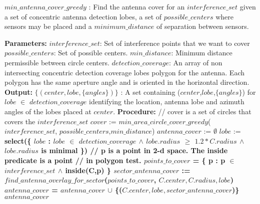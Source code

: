 \begin{algorithm}[!htb]
\caption{\textbf{$min\_antenna\_cover\_greedy$} : Find the antenna cover for an $interference\_set$ given a set of concentric antenna
detection lobes, a set of $possible\_centers$ where sensors may be placed and a $minimum\_distance$ of separation between sensors.}
\begin{algorithmic}
\State \textbf{Parameters:}
\State \tab $interference\_set$: Set of interference points that we want to cover
\State \tab $possible\_centers$: Set of possible centers.  
\State \tab $min\_distance$: Minimum distance permissible between circle centers.
\State \tab $detection\_coverage$: An array of non intersecting concentric detection 
\State \tab \tab coverage lobes polygon for the antenna. 
\State \tab \tab Each polygon has the same aperture angle and is 
\State \tab \tab oriented in the horizontal direction.
\State \textbf{Output:}
\State \tab $\{(center,lobe,\{angles\})\}$ : A set containing ($center$,$lobe$,$\{angles\}$)
\State \tab \tab \tab for $lobe$ $\in$ $detection\_coverage$ identifying
\State \tab \tab \tab the location, antenna lobe and azimuth angles of the lobes 
\State \tab \tab \tab placed at $center$.
\State \textbf{Procedure:}
\State 
\State // cover is a set of circles that covers the $interference\_set$
\State  $cover$ := $min\_area\_circle\_cover\_greedy$($interference\_set$,
\State \tab \tab \tab $possible\_centers$,$min\_distance$)
\State 
\State $antenna\_cover$ := $\emptyset$  
\State  $lobe$ := \bf{select}(\{ $lobe$ : $lobe$  $\in$ $detection\_coverage$ 
\State  \tab \tab $\wedge$ $lobe.radius$ $\ge$ $1.2*C.radius$ 
\State  \tab \tab $\wedge$ $lobe.radius$ is minimal \})
\State  // p is a point in 2-d space. The inside predicate is a point 
\State  // in polygon test.
\State  $points\_to\_cover$ = \{ p : p $\in$ $interference\_set$ $\wedge$ \bf{inside}(C,p) \}
\State  $sector\_antenna\_cover$ := $find\_antenna\_overlay\_for\_sector$($points\_to\_cover$, 
\State  \tab \tab\tab  $C.center, C.radius, lobe$)
\State  $antenna\_cover$ = $antenna\_cover$ $\cup$ 
\State  \tab \tab \{($C.center, lobe,sector\_antenna\_cover$)\}
\EndFor
\State \Return $antenna\_cover$
 
\end{algorithmic}
\end{algorithm}
